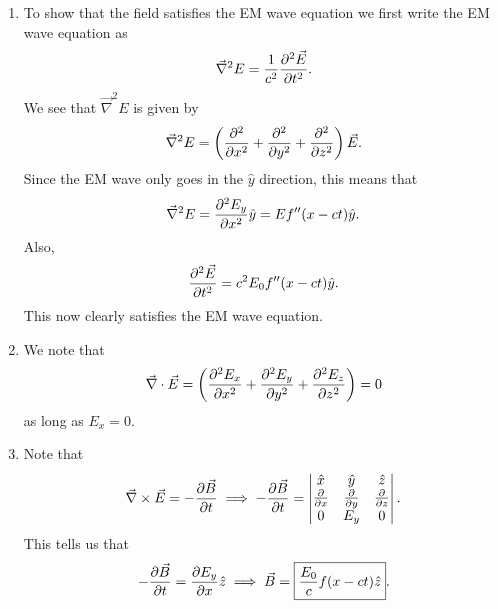 \begin{sol}
\begin{enumerate}[label=\textbf{(\alph*)}]
\item To show that the field satisfies the EM wave equation we first write the EM wave equation as 
\[\vec{\nabla}^2 E = \frac{1}{c^2}\pdv{^{2}\vec{E}}{t^2}.\]
We see that $\vec{\nabla}^2 E$ is given by 
\[\vec{\nabla}^2 E = \left(\pdv{^2}{x^2} + \pdv{^2}{y^2} + \pdv{^2}{z^2}\right)\vec{E}.\]
Since the EM wave only goes in the $\hat{y}$ direction, this means that 
\[\vec{\nabla}^2 E = \pdv{^2 E_y}{x^2}\hat{y} = E f^{\prime \prime} (x - ct)\hat{y}.\]
Also, 
\[\pdv{^2 \vec{E}}{t^2} = c^2 E_0 f^{\prime \prime} (x - ct)\hat{y}.\]
This now clearly satisfies the EM wave equation.

\item We note that 
\[\vec{\nabla}\cdot \vec{E} = \left(\pdv{^2 E_x}{x^2} + \pdv{^2 E_y}{y^2} + \pdv{^2 E_z}{z^2}\right) = 0\]
as long as $E_x = 0$.

\item Note that 
\[\vec{\nabla}\times \vec{E} = -\pdv{\vec{B}}{t} \implies -\pdv{\vec{B}}{t} = 
\begin{vmatrix}
\hat{x} & \hat{y} & \hat{z} \\
\pdv{}{x} & \pdv{}{y} & \pdv{}{z} \\
0 & E_y & 0
\end{vmatrix}.
\]
This tells us that 
\[-\pdv{\vec{B}}{t} = \pdv{E_y}{x} \hat{z}\implies \vec{B} = \boxed{\frac{E_0}{c} f (x - ct) \hat{z}}.\]
\end{enumerate}
\end{sol}